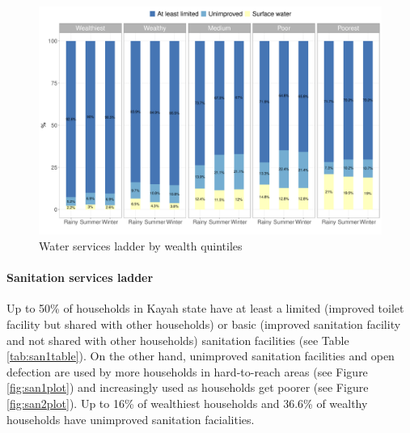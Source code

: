 \documentclass[12pt,a4paper]{article}
\let\oldparagraph\paragraph
\renewcommand{\paragraph}[1]{\oldparagraph{#1}\mbox{}}
\begin{document}
\begin{figure}[H]

{\centering \includegraphics{kayahReport_files/figure-latex/wash2plot-1} 

}

\caption{Water services ladder by wealth quintiles}\label{fig:wash2plot}
\end{figure}

\hypertarget{sanitation-services-ladder}{%
\paragraph{Sanitation services ladder}\label{sanitation-services-ladder}}

Up to 50\% of households in Kayah state have at least a limited (improved toilet facility but shared with other households) or basic (improved sanitation facility and not shared with other households) sanitation facilities (see Table \ref{tab:san1table}). On the other hand, unimproved sanitation facilities and open defection are used by more households in hard-to-reach areas (see Figure \ref{fig:san1plot}) and increasingly used as households get poorer (see Figure \ref{fig:san2plot}). Up to 16\% of wealthiest households and 36.6\% of wealthy households have unimproved sanitation facialities.
\end{document}
